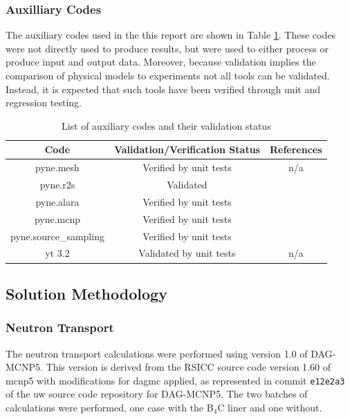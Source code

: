 \documentclass[12pt]{article}
\begin{document}
\subsubsection*{Auxilliary Codes}
The auxiliary codes used in the this report are shown in Table 
\ref{table:validation_aux}. These codes were not directly used to 
produce results, but were used to either process or produce input
and output data.  Moreover, because validation implies the comparison
of physical models to experiments not all tools can be validated.  
Instead, it is expected that such tools have been verified through
unit and regression testing.
\begin{centering}
 \begin{table}[ht!]
  \begin{tabular}{c | c | c}
  \hline
  Code & Validation/Verification Status & References \\    
  \hline
  pyne.mesh & Verified by unit tests & n/a \\
  pyne.r2s & Validated & \cite{Biondo201677} \\
  pyne.alara & Verified by unit tests & \cite{Biondo201677}  \\
  pyne.mcnp & Verified by unit tests & \cite{Biondo201677}  \\
  pyne.source\_sampling & Verified by unit tests & \cite{Biondo201677} \\
  yt 3.2 & Validated by unit tests & n/a \\
 \end{tabular}
 \caption{List of auxiliary codes and their validation status}
 \label{table:validation_aux}
 \end{table}
\end{centering}

\newpage
\subsection{Solution Methodology}
\label{section:method}
\subsubsection{Neutron Transport}
The neutron transport calculations were performed using version 1.0 of DAG-MCNP5.
This version is derived from the RSICC source code version 1.60 of \gls{mcnp5}
with modifications for \gls{dagmc} applied, as represented in commit \texttt{e12e2a3}
of the \gls{uw} source code repository for DAG-MCNP5.
The two batches of calculations were performed, one
case with the B$_4$C liner and one without.  
\end{document}
